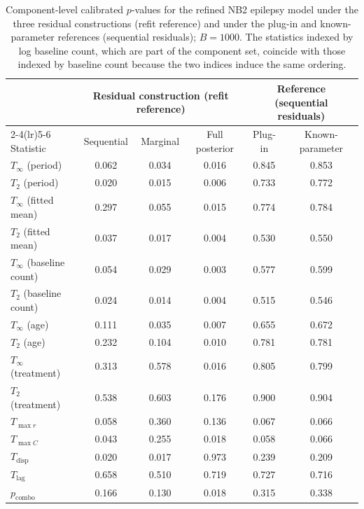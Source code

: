 \begin{table}[htbp]
\centering
\small
\caption{Component-level calibrated $p$-values for the refined NB2 epilepsy model under the three residual constructions (refit reference) and under the plug-in and known-parameter references (sequential residuals); $B=1000$. The statistics indexed by log baseline count, which are part of the component set, coincide with those indexed by baseline count because the two indices induce the same ordering.}
\label{tab:ablation-epil-components-refined}
\begin{tabular*}{\textwidth}{@{}l@{\extracolsep{\fill}}ccccc@{}}
\toprule
 & \multicolumn{3}{c}{Residual construction (refit reference)} & \multicolumn{2}{c}{Reference (sequential residuals)} \\
\cmidrule(lr){2-4}\cmidrule(lr){5-6}
Statistic & Sequential & Marginal & Full posterior & Plug-in & Known-parameter \\
\midrule
$T_{\infty}$ (period) & 0.062 & 0.034 & 0.016 & 0.845 & 0.853 \\
$T_{2}$ (period) & 0.020 & 0.015 & 0.006 & 0.733 & 0.772 \\
$T_{\infty}$ (fitted mean) & 0.297 & 0.055 & 0.015 & 0.774 & 0.784 \\
$T_{2}$ (fitted mean) & 0.037 & 0.017 & 0.004 & 0.530 & 0.550 \\
$T_{\infty}$ (baseline count) & 0.054 & 0.029 & 0.003 & 0.577 & 0.599 \\
$T_{2}$ (baseline count) & 0.024 & 0.014 & 0.004 & 0.515 & 0.546 \\
$T_{\infty}$ (age) & 0.111 & 0.035 & 0.007 & 0.655 & 0.672 \\
$T_{2}$ (age) & 0.232 & 0.104 & 0.010 & 0.781 & 0.781 \\
$T_{\infty}$ (treatment) & 0.313 & 0.578 & 0.016 & 0.805 & 0.799 \\
$T_{2}$ (treatment) & 0.538 & 0.603 & 0.176 & 0.900 & 0.904 \\
$T_{\max r}$ & 0.058 & 0.360 & 0.136 & 0.067 & 0.066 \\
$T_{\max C}$ & 0.043 & 0.255 & 0.018 & 0.058 & 0.066 \\
$T_{\mathrm{disp}}$ & 0.020 & 0.017 & 0.973 & 0.239 & 0.209 \\
$T_{\mathrm{lag}}$ & 0.658 & 0.510 & 0.719 & 0.727 & 0.716 \\
\midrule
$p_{\mathrm{combo}}$ & 0.166 & 0.130 & 0.018 & 0.315 & 0.338 \\
\bottomrule
\end{tabular*}
\end{table}
